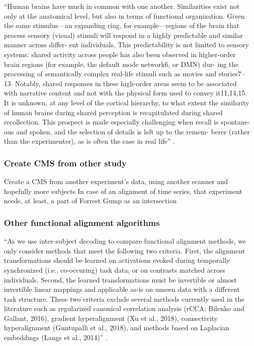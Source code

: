 ``Human brains have much in common with one another. Similarities exist not only
at the anatomical level, but also in terms of functional organization. Given the
same stimulus—an expanding ring, for example—regions of the brain that process
sensory (visual) stimuli will respond in a highly predictable and similar manner
across differ- ent individuals. This predictability is not limited to sensory
systems: shared activity across people has also been observed in higher-order
brain regions (for example, the default mode network6, or DMN) dur- ing the
processing of semantically complex real-life stimuli such as movies and
stories7–13. Notably, shared responses in these high-order areas seem to be
associated with narrative content and not with the physical form used to convey
it11,14,15. It is unknown, at any level of the cortical hierarchy, to what
extent the similarity of human brains during shared perception is recapitulated
during shared recollection. This prospect is made especially challenging when
recall is spontane- ous and spoken, and the selection of details is left up to
the remem- berer (rather than the experimenter), as is often the case in real
life'' \citep{chen2017shared}.



\subsubsection{Create CMS from other study}

%
Create a CMS from another experiment's data,
using another scanner and hopefully more subjects
%
In case of an alignment of time series,
that experiment needs, at least, a part of Forrest Gump as an intersection


\subsubsection{Other functional alignment algorithms}



``As we use inter-subject decoding to compare functional alignment methods, we
only consider methods that meet the following two criteria. First, the alignment
transformations should be learned on activations evoked during temporally
synchronized (i.e., co-occuring) task data, or on contrasts matched across
individuals. Second, the learned transformations must be invertible or almost
invertible linear mappings and applicable as-is on unseen data with a different
task structure. These two criteria exclude several methods currently used in the
literature such as regularized canonical correlation analysis (rCCA; Bilenko and
Gallant, 2016), gradient hyperalignment (Xu et al., 2018), connectivity
hyperalignment (Guntupalli et al., 2018), and methods based on Laplacian
embeddings (Langs et al., 2014)'' \citep{bazeille2021empirical}.

